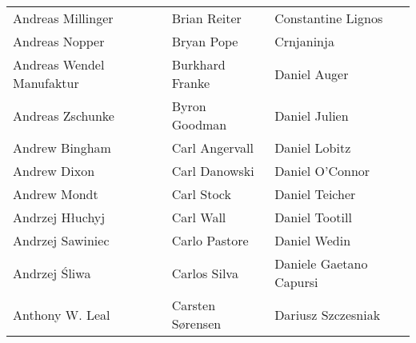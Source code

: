 \begin{tabular}{p{4.5cm}p{4.5cm}p{4.5cm}}
Andreas Millinger & Brian Reiter & Constantine Lignos \\
Andreas Nopper & Bryan Pope & Crnjaninja \\
Andreas Wendel Manufaktur & Burkhard Franke & Daniel Auger \\
Andreas Zschunke & Byron Goodman & Daniel Julien \\
Andrew Bingham & Carl Angervall & Daniel Lobitz \\
Andrew Dixon & Carl Danowski & Daniel O'Connor \\
Andrew Mondt & Carl Stock & Daniel Teicher \\
Andrzej Hłuchyj & Carl Wall & Daniel Tootill \\
Andrzej Sawiniec & Carlo Pastore & Daniel Wedin \\
Andrzej Śliwa & Carlos Silva & Daniele Gaetano Capursi \\
Anthony W. Leal & Carsten Sørensen & Dariusz Szczesniak \\
\end{tabular}
\newpage
\setlength{\tabcolsep}{1mm}
